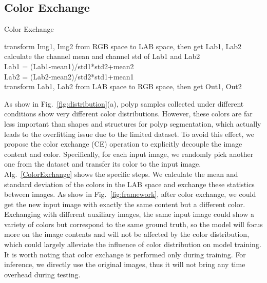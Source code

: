 \documentclass[runningheads]{llncs}
\begin{document}
\subsection{Color Exchange}
\begin{algorithm}[t]
    \caption{Color Exchange}
    \label{ColorExchange}
    \LinesNumbered
    transform Img1, Img2 from RGB space to LAB space, then get Lab1, Lab2\\
    calculate the channel mean and channel std of Lab1 and Lab2\\
    Lab1 = (Lab1-mean1)/std1*std2+mean2\\
    Lab2 = (Lab2-mean2)/std2*std1+mean1\\
    transform Lab1, Lab2 from LAB space to RGB space, then get Out1, Out2
\end{algorithm}
As show in Fig.~\ref{fig:distribution}(a), polyp samples collected under different conditions show very different color distributions. However, these colors are far less important than shapes and structures for polyp segmentation, which actually leads to the overfitting issue due to the limited dataset. To avoid this effect, we propose the color exchange (CE) operation to explicitly decouple the image content and color. Specifically, for each input image, we randomly pick another one from the dataset and transfer its color to the input image. Alg.~\ref{ColorExchange} shows the specific steps. We calculate the mean and standard deviation of the colors in the LAB space and exchange these statistics between images. As show in Fig.~\ref{fig:framework}, after color exchange, we could get the new input image with exactly the same content but a different color. Exchanging with different auxiliary images, the same input image could show a variety of colors but correspond to the same ground truth, so the model will focus more on the image contents and will not be affected by the color distribution, which could largely alleviate the influence of color distribution on model training. It is worth noting that color exchange is performed only during training. For inference, we directly use the original images, thus it will not bring any time overhead during testing.
\end{document}
